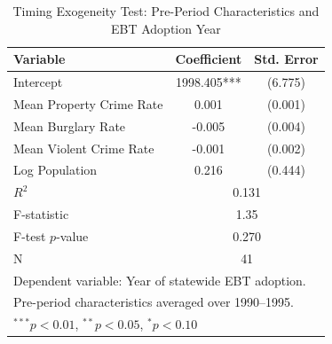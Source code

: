 \begin{table}[htbp]
\centering
\caption{Timing Exogeneity Test: Pre-Period Characteristics and EBT Adoption Year}
\label{tab:timing}
\begin{tabular}{lcc}
\toprule
Variable & Coefficient & Std. Error \\
\midrule
Intercept & 1998.405*** & (6.775) \\
Mean Property Crime Rate & 0.001 & (0.001) \\
Mean Burglary Rate & -0.005 & (0.004) \\
Mean Violent Crime Rate & -0.001 & (0.002) \\
Log Population & 0.216 & (0.444) \\
\midrule
$R^2$ & \multicolumn{2}{c}{0.131} \\
F-statistic & \multicolumn{2}{c}{1.35} \\
F-test $p$-value & \multicolumn{2}{c}{0.270} \\
N & \multicolumn{2}{c}{41} \\
\bottomrule
\multicolumn{3}{l}{\footnotesize Dependent variable: Year of statewide EBT adoption.} \\
\multicolumn{3}{l}{\footnotesize Pre-period characteristics averaged over 1990--1995.} \\
\multicolumn{3}{l}{\footnotesize $^{***}p<0.01$, $^{**}p<0.05$, $^{*}p<0.10$} \\
\end{tabular}
\end{table}

